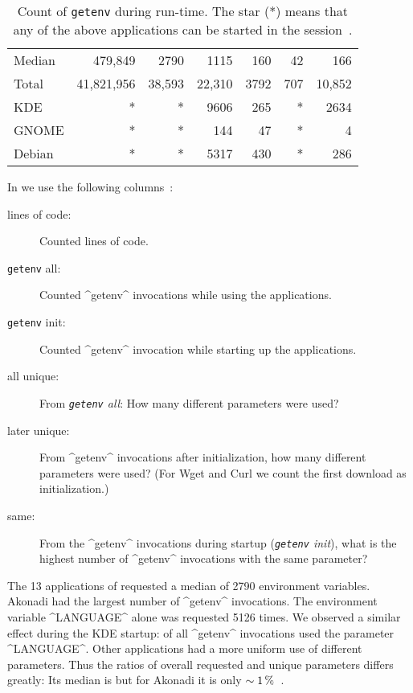 {\begin{table}[htp]
\begin{tabularx}{\textwidth}{ l  r  R  R  R  R  R   }
\hline
Median       & 479,849 & 2790 & 1115 & 160 & 42 & 166 \\
Total        & 41,821,956 & 38,593 & 22,310 & 3792 & 707 & 10,852 \\



\hline
KDE          & * & * & 9606 & 265 & * & 2634 \\
GNOME        & * & * & 144  & 47 & *  & 4 \\



Debian       & * & * & 5317 & 430 & * & 286  \\



\end{tabularx}
\caption[Count of \texttt{getenv} at run-time.]{Count of \texttt{getenv} during run-time. The star (*) means that any of the above applications can be started in the session~\cite{raab2016unanticipated}.}
\label{tab:count-runtime}
\end{table}
}

In  we use the following columns~\cite{raab2016unanticipated}:
\begin{description}
\item[lines of code:] Counted lines of code.
\item[\texttt{getenv} all:] Counted ^getenv^ invocations while using the applications.
\item[\texttt{getenv} init:] Counted ^getenv^ invocation while starting up the applications.
\item[all unique:] From \emph{\texttt{getenv} all}: How many different parameters were used?
\item[later unique:] From ^getenv^ invocations after initialization, how many different parameters were used?
	(For Wget and Curl we count the first download as initialization.)
\item[same:] From the ^getenv^ invocations during startup (\emph{\texttt{getenv} init}),
	what is the highest number of ^getenv^ invocations with the same parameter?
\end{description}

The 13 applications of  requested a median of 2790 environment variables.
Akonadi had the largest number of ^getenv^ invocations.
The environment variable ^LANGUAGE^ alone was requested 5126 times.
We observed a similar effect during the KDE startup:
 of all ^getenv^ invocations used the parameter ^LANGUAGE^.
Other applications had a more uniform use of different parameters.
Thus the ratios of overall requested and unique parameters differs greatly:
Its median is  but for Akonadi it is only $\sim\SI{1}{\percent}$~\cite{raab2016unanticipated}.


